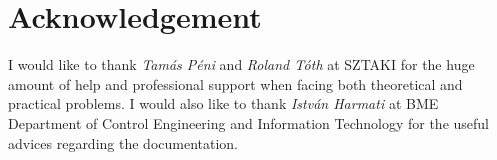 \section*{Acknowledgement}
I would like to thank \textit{Tamás Péni} and \textit{Roland Tóth} at SZTAKI for the huge amount of help and professional support when facing both theoretical and practical problems. I would also like to thank \textit{István Harmati} at BME Department of Control Engineering and Information Technology for the useful advices regarding the documentation.
